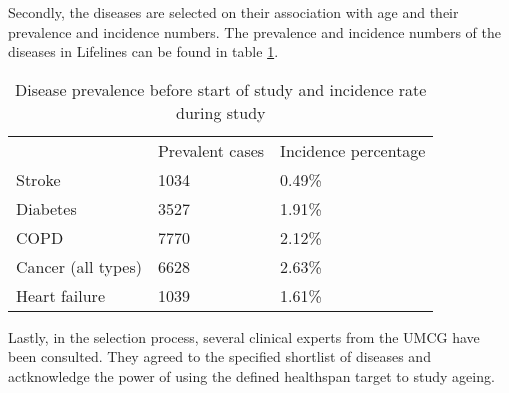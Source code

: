 Secondly, the diseases are selected on their association with age and their prevalence and incidence numbers. The prevalence and incidence numbers of the diseases in Lifelines can be found in table \ref{table:data:disease_prevalence_incidence}. 
\vspace{0.5cm}
\begin{table} [H]
    \centering
    \caption{Disease prevalence before start of study and incidence rate during study}
    \begin{tabular}{lll}
    \cline{1-3}
                       & Prevalent cases & Incidence percentage\\ \cline{1-3}
    Stroke             & 1034            & 0.49\%                   \\
    Diabetes           & 3527            & 1.91\%             \\
    COPD               & 7770            & 2.12\%              \\
    Cancer (all types) & 6628            & 2.63\%              \\
    Heart failure           & 1039             & 1.61\%             
    \end{tabular}
    \label{table:data:disease_prevalence_incidence}
\end{table} 

Lastly, in the selection process, several clinical experts from the UMCG have been consulted. They agreed to the specified shortlist of diseases and actknowledge the power of using the defined healthspan target to study ageing. 

